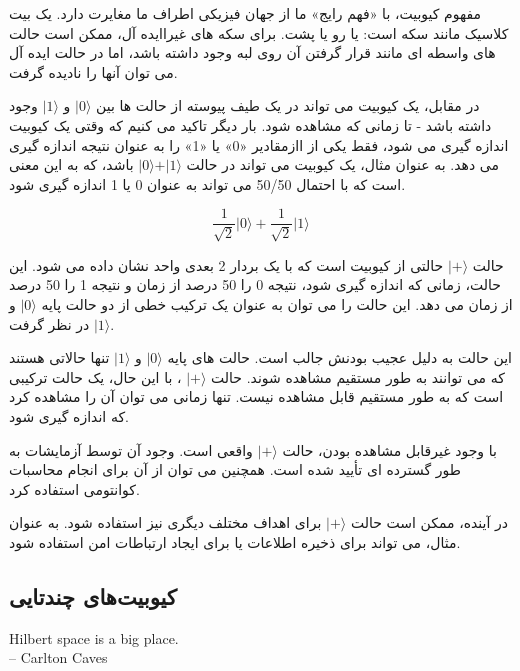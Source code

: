 \documentclass{book}
\begin{document}
مفهوم کیوبیت، با «فهم رایج» ما از جهان فیزیکی اطراف ما مغایرت دارد. یک بیت کلاسیک مانند سکه است: یا رو یا پشت. برای سکه های غیراایده آل، ممکن است حالت های واسطه ای مانند قرار گرفتن آن روی لبه وجود داشته باشد، اما در حالت ایده آل می توان آنها را نادیده گرفت. 

در مقابل، یک کیوبیت می تواند در یک طیف پیوسته از حالت ها بین $\vert0\rangle$ و $\vert1\rangle$ وجود داشته باشد - تا زمانی که مشاهده شود. بار دیگر تاکید می کنیم که وقتی یک کیوبیت اندازه گیری می شود، فقط یکی از اازمقادیر «0» یا «1» را به عنوان نتیجه اندازه گیری می دهد. به عنوان مثال، یک کیوبیت می تواند در حالت
 $\vert0\rangle + \vert1\rangle$ باشد، که به این معنی است که با احتمال 50/50 می تواند به عنوان 0 یا 1 اندازه گیری شود.


\begin{center}
	\begin{equation}\label{superposition}
		\frac{1}{\sqrt{2}} \vert 0\rangle + \frac{1}{\sqrt{2}} \vert 1\rangle
	\end{equation}
	
\end{center}

حالت $\vert+\rangle$ حالتی از کیوبیت است که با یک بردار 2 بعدی واحد نشان داده می شود. این حالت، زمانی که اندازه گیری شود، نتیجه 0 را 50 درصد از زمان و نتیجه 1 را 50 درصد از زمان می دهد. این حالت را می توان به عنوان یک ترکیب خطی از دو حالت پایه $\vert0\rangle$ و $\vert 1 \rangle$ در نظر گرفت.

این حالت به دلیل عجیب بودنش جالب است. حالت های پایه $\vert 0 \rangle$ و $\vert 1 \rangle$ تنها حالاتی هستند که می توانند به طور مستقیم مشاهده شوند. حالت $\vert + \rangle$ ، با این حال، یک حالت ترکیبی است که به طور مستقیم قابل مشاهده نیست. تنها زمانی می توان آن را مشاهده کرد که اندازه گیری شود.

با وجود غیرقابل مشاهده بودن، حالت $\vert + \rangle$ واقعی است. وجود آن توسط آزمایشات به طور گسترده ای تأیید شده است. همچنین می توان از آن برای انجام محاسبات کوانتومی استفاده کرد.

در آینده، ممکن است حالت $\vert + \rangle$ برای اهداف مختلف دیگری نیز استفاده شود. به عنوان مثال، می تواند برای ذخیره اطلاعات یا برای ایجاد ارتباطات امن استفاده شود.

\subsection{کیوبیت‌های چندتایی}

\begin{latin}
	Hilbert space is a big place.\\
	\hspace{2cm}– Carlton Caves
\end{latin}
\end{document}
